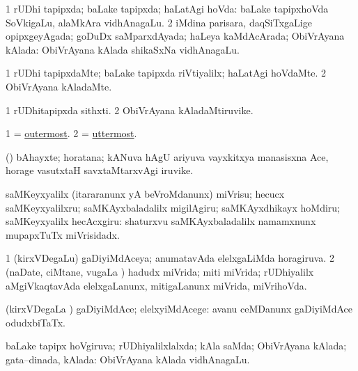 \bentry
{}
\gl{\gu}
\bmng
\bnum
\num{1} rUDhi tapipxda; baLake tapipxda; haLatAgi hoVda:  baLake tapipxhoVda SoVkigaLu, alaMkAra vidhAnagaLu. 
\num{2} iMdina parisara, daqSiTxgaLige opipxgeyAgada; goDuDx saMparxdAyada; haLeya kaMdAcArada; ObiVrAyana kAlada:  ObiVrAyana kAlada shikaSxNa vidhAnagaLu. 
\enum
\emng
\eentry

\bentry
{}
\gl{\kirxvi}
\bmng
\bnum
\num{1} rUDhi tapipxdaMte; baLake tapipxda riVtiyalilx; haLatAgi hoVdaMte.
\num{2} ObiVrAyana kAladaMte. 
\enum
\emng
\eentry

\bentry
{}
\gl{\nA}
\bmng
\bnum
\num{1} rUDhitapipxda sithxti. 
\num{2} ObiVrAyana kAladaMtiruvike. 
\enum
\emng
\eentry

\bentry
{}
\gl{\gu}
\bmng
\bnum
\num{1} = \hyperlink{outermost}{outermost}. 
\num{2} = \hyperref{kandict_u.pdf}{U}{uttermost}{uttermost}. 
\enum
\emng
\eentry

\bentry
{}
\gl{\nA}
\bmng
(\tashA) bAhayxte; horatana; kANuva hAgU ariyuva vayxkitxya manasisxna Ace, horage vasutxtaH savxtaMtarxvAgi iruvike. 
\emng
\eentry

\bentry
{}
\gl{\sakirx}
\bmng
saMKeyxyalilx (itararanunx yA beVroMdanunx) miVrisu; hecucx saMKeyxyalilxru; saMKAyxbaladalilx migilAgiru; saMKAyxdhikayx hoMdiru; saMKeyxyalilx hecAcxgiru:  shaturxvu saMKAyxbaladalilx namamxnunx mupapxTuTx miVrisidadx. 
\emng
\eentry

\bentry
{}
\gl{\gu}
\bmng
\bnum
\num{1} (kirxVDegaLu) gaDiyiMdAceya; anumatavAda elelxgaLiMda horagiruva. 
\num{2} (naDate, ciMtane, \mo vugaLa \vi) hadudx miVrida; miti miVrida; rUDhiyalilx aMgiVkaqtavAda elelxgaLanunx, mitigaLanunx miVrida, miVrihoVda. 
\enum
\emng
\eentry

\bentry
{}
\gl{\kirxvi}
\bmng
(kirxVDegaLa \vi) gaDiyiMdAce; elelxyiMdAcege:  avanu ceMDanunx gaDiyiMdAce odudxbiTaTx. 
\emng
\eentry

\bentry
{}
\gl{\gu}
\bmng
baLake tapipx hoVgiruva; rUDhiyalilxlalxda; kAla saMda; ObiVrAyana kAlada; gata--dinada, kAlada:  ObiVrAyana kAlada vidhAnagaLu. 
\emng
\eentry


